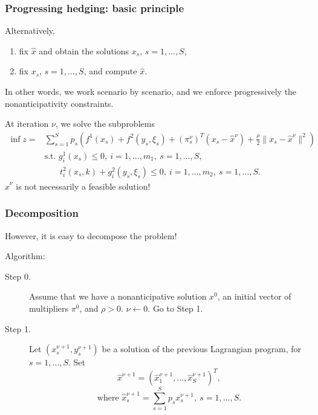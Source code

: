 \documentclass{beamer}
\begin{document}
\begin{frame}
\frametitle{Progressing hedging: basic principle}

Alternatively,
\begin{enumerate}
\item
fix $\hat{x}$ and obtain the solutions $x_s$, $s = 1,\ldots,S$,
\item
fix $x_s$, $s = 1,\ldots,S$, and compute $\hat{x}$.
\end{enumerate}
In other words, we work scenario by scenario, and we enforce progressively the nonanticipativity constraints.

\mbox{}

At iteration $\nu$, we solve the subproblems
\begin{align*}
\inf z = & \sum_{s=1}^S p_s\left( f^1(x_s) + f^2\left(y_s,\xi_s\right) +
\left(\pi_s^{\nu}\right)^T\left(x_s-\hat{x}^{\nu}\right)+\frac{\rho}{2}\|
x_s-\hat{x}^{\nu} \|^2\right) \\
& \text{s.t. } g_i^1(x_s) \leq 0,\ i=1,\ldots{},m_1,\ s=1,\ldots{},S,\\
& \phantom{\text{t.q. }}
t_i^2\left(x_s,k\right)+g_i^2\left(y_s,\xi_s\right) \leq 0,\
i=1,\ldots{},m_2,\ s=1,\ldots{},S.
\end{align*}
$\hat{x}^{\nu}$ is not necessarily a feasible solution!

\end{frame}

\begin{frame}
\frametitle{Decomposition}

However, it is easy to decompose the problem!

Algorithm:
\begin{description}
\item[Step 0.]
Assume that we have a nonanticipative solution $x^0$, an initial vector of multipliers $\pi^0$, and $\rho > 0$.
  $\nu \leftarrow 0$. Go to Step 1.
\item[Step 1.]
Let $\left(x_s^{\nu+1}, y_s^{\nu+1}\right)$ be a solution of the previous Lagrangian program, for $s=1,\ldots{},S$. Set
\[
\hat{x}^{\nu+1} = \left( \hat{x}_1^{\nu+1}, \ldots{}, \hat{x}_S^{\nu+1}\right)^T,
\]
\[
\mbox{where } \hat{x}_s^{\nu+1} = \sum_{s=1}^S p_s x_s^{\nu+1},\ s=1,\ldots,S.
\]
\end{description}

\end{frame}
\end{document}
